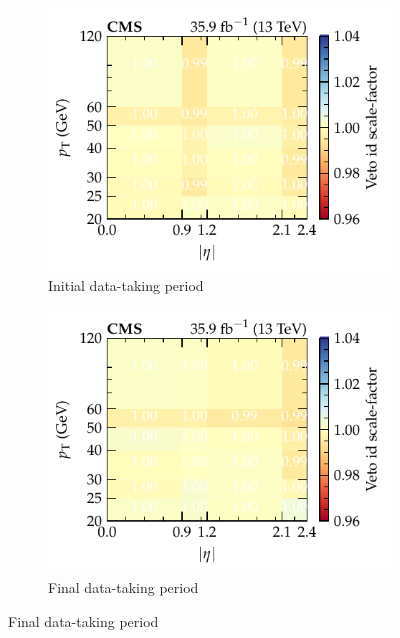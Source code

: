 \begin{figure}[htb]
    \centering
    \begin{subfigure}[b]{0.49\textwidth}
        \centering
        \includegraphics{chapters/041_corrections/images/efficiencies/objects/muons/muon_id_loose_runbf.pdf}
        \caption{Initial data-taking period}
        \label{subfiga:muon-id-scale-factors}
    \end{subfigure}
    \hfill
    \begin{subfigure}[b]{0.49\textwidth}
        \centering
        \includegraphics{chapters/041_corrections/images/efficiencies/objects/muons/muon_id_loose_rungh.pdf}
        \caption{Final data-taking period}
        \label{subfigb:muon-id-scale-factors}
    \end{subfigure}

\end{figure}
